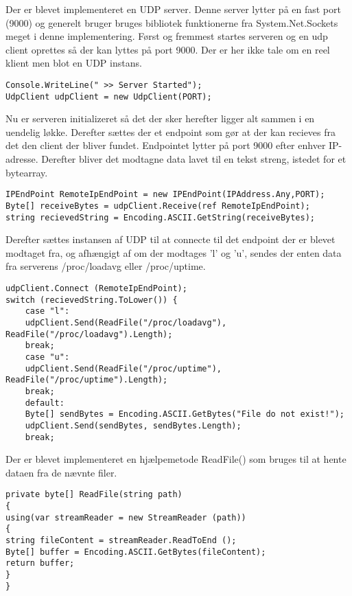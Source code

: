 Der er blevet implementeret en UDP server. Denne server lytter på en fast port (9000) og generelt bruger bruges bibliotek funktionerne fra System.Net.Sockets meget i denne implementering. Først og fremmest startes serveren og en udp client oprettes så der kan lyttes på port 9000. Der er her ikke tale om en reel klient men blot en UDP instans.

\begin{verbatim}
Console.WriteLine(" >> Server Started");
UdpClient udpClient = new UdpClient(PORT);
\end{verbatim}

\noindent Nu er serveren initializeret så det der sker herefter ligger alt sammen i en uendelig løkke. Derefter sættes der et endpoint som gør at der kan recieves fra det den client der bliver fundet. Endpointet lytter på port 9000 efter enhver IP-adresse. Derefter bliver det modtagne data lavet til en tekst streng, istedet for et bytearray.  

\begin{verbatim}
IPEndPoint RemoteIpEndPoint = new IPEndPoint(IPAddress.Any,PORT);
Byte[] receiveBytes = udpClient.Receive(ref RemoteIpEndPoint);
string recievedString = Encoding.ASCII.GetString(receiveBytes);
\end{verbatim}

\noindent Derefter sættes instansen af UDP til at connecte til det endpoint der er blevet modtaget fra, og afhængigt af om der modtages 'l' og 'u', sendes der enten data fra serverens /proc/loadavg eller /proc/uptime. 

\begin{verbatim}
udpClient.Connect (RemoteIpEndPoint);
switch (recievedString.ToLower()) {
	case "l":
	udpClient.Send(ReadFile("/proc/loadavg"), ReadFile("/proc/loadavg").Length);
	break;
	case "u":
	udpClient.Send(ReadFile("/proc/uptime"), ReadFile("/proc/uptime").Length);
	break;
	default:
	Byte[] sendBytes = Encoding.ASCII.GetBytes("File do not exist!");
	udpClient.Send(sendBytes, sendBytes.Length);
	break;
\end{verbatim}

\noindent Der er blevet implementeret en hjælpemetode ReadFile() som bruges til at hente dataen fra de nævnte filer.

\begin{verbatim}
private byte[] ReadFile(string path)
{
using(var streamReader = new StreamReader (path))
{
string fileContent = streamReader.ReadToEnd ();
Byte[] buffer = Encoding.ASCII.GetBytes(fileContent);
return buffer;
}
}
\end{verbatim}

